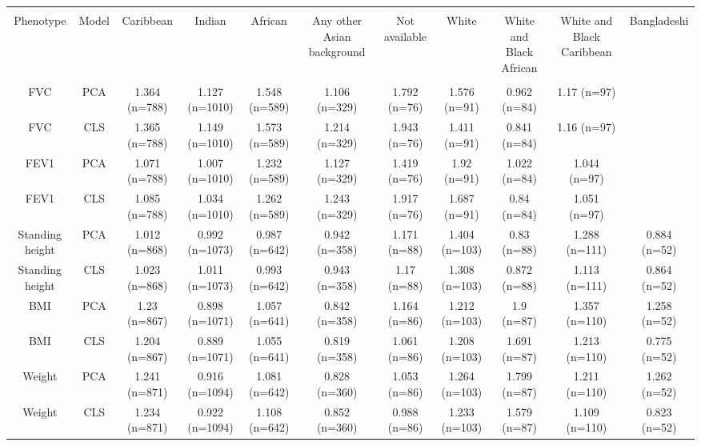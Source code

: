 \begin{landscape}

\begin{table}[!htbp] \centering 
\tiny 
{}
\begin{tabular}{ ccccccccccc} 
\\[-1.8ex]\hline 
\hline \\[-1.8ex] 
Phenotype & Model & Caribbean & Indian & African & Any other Asian background & Not available & White & White and Black African & White and Black Caribbean & Bangladeshi \\ 
\hline \\[-1.8ex] 
FVC & PCA & 1.364 (n=788) & 1.127 (n=1010) & 1.548 (n=589) & 1.106 (n=329) & 1.792 (n=76) & 1.576 (n=91) & 0.962 (n=84) & 1.17 (n=97) &  \\ 
FVC & CLS & 1.365 (n=788) & 1.149 (n=1010) & 1.573 (n=589) & 1.214 (n=329) & 1.943 (n=76) & 1.411 (n=91) & 0.841 (n=84) & 1.16 (n=97) &  \\ 
FEV1 & PCA & 1.071 (n=788) & 1.007 (n=1010) & 1.232 (n=589) & 1.127 (n=329) & 1.419 (n=76) & 1.92 (n=91) & 1.022 (n=84) & 1.044 (n=97) &  \\ 
FEV1 & CLS & 1.085 (n=788) & 1.034 (n=1010) & 1.262 (n=589) & 1.243 (n=329) & 1.917 (n=76) & 1.687 (n=91) & 0.84 (n=84) & 1.051 (n=97) &  \\ 
Standing height & PCA & 1.012 (n=868) & 0.992 (n=1073) & 0.987 (n=642) & 0.942 (n=358) & 1.171 (n=88) & 1.404 (n=103) & 0.83 (n=88) & 1.288 (n=111) & 0.884 (n=52) \\ 
Standing height & CLS & 1.023 (n=868) & 1.011 (n=1073) & 0.993 (n=642) & 0.943 (n=358) & 1.17 (n=88) & 1.308 (n=103) & 0.872 (n=88) & 1.113 (n=111) & 0.864 (n=52) \\ 
BMI & PCA & 1.23 (n=867) & 0.898 (n=1071) & 1.057 (n=641) & 0.842 (n=358) & 1.164 (n=86) & 1.212 (n=103) & 1.9 (n=87) & 1.357 (n=110) & 1.258 (n=52) \\ 
BMI & CLS & 1.204 (n=867) & 0.889 (n=1071) & 1.055 (n=641) & 0.819 (n=358) & 1.061 (n=86) & 1.208 (n=103) & 1.691 (n=87) & 1.213 (n=110) & 0.775 (n=52) \\ 
Weight & PCA & 1.241 (n=871) & 0.916 (n=1094) & 1.081 (n=642) & 0.828 (n=360) & 1.053 (n=86) & 1.264 (n=103) & 1.799 (n=87) & 1.211 (n=110) & 1.262 (n=52) \\ 
Weight & CLS & 1.234 (n=871) & 0.922 (n=1094) & 1.108 (n=642) & 0.852 (n=360) & 0.988 (n=86) & 1.233 (n=103) & 1.579 (n=87) & 1.109 (n=110) & 0.823 (n=52) \\ 

\end{tabular}
\end{table}
\end{landscape}

